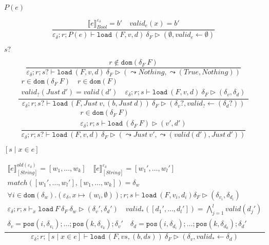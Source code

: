 \documentclass{report}
\theoremstyle{theorem}
\begin{document}
$\boxed{P(e)}$

\begin{displaymath}
	\frac{\llbracket e \rrbracket^{\varepsilon_\delta}_{Bool} = b' \quad valid_e(x) = b'}
	{\varepsilon_\delta ; r ; P(e) \vdash \mathtt{load}~ (F,v,d)~ \delta_F \rhd (\emptyset,valid_e \leftarrow \emptyset)}
\end{displaymath}

$\boxed{s?}$

\begin{displaymath}
	\frac{r \notin \mathtt{dom}(\delta_F~F)}
	{\varepsilon_\delta ; r ; s? \vdash \mathtt{load}~ (F,v,d)~ \delta_F \rhd (\leadsto Nothing,\leadsto (True,Nothing))}
\end{displaymath}
\begin{displaymath}
	\frac{\begin{array}{c}
		r \in \mathtt{dom}(\delta_F~F) \quad r \in \mathtt{dom}(F)\\
		valid_?(Just~d') = valid(d')\quad
		\varepsilon_\delta ; r ; s \vdash \mathtt{load}~ (F,v,d)~ \delta_F \rhd (\delta_v,\delta_d)
	\end{array}}
	{\varepsilon_\delta ; r ; s? \vdash \mathtt{load}~ (F,Just ~v,(b,Just ~d))~ \delta_F \rhd (\delta_v?,valid_? \leftarrow (\delta_d?))}
\end{displaymath}
\begin{displaymath}
	\frac{\begin{array}{c}
		r \in \mathtt{dom}(\delta_F~F) \\
		\varepsilon_\delta ; r ; s \vdash \mathtt{load}~ (\delta_F~F) \rhd (v',d')
	\end{array}}
	{\varepsilon_\delta ; r ; s? \vdash \mathtt{load}~ (F,v,d)~ \delta_F \rhd (\leadsto Just~v',\leadsto (valid(d'),Just~d'))}
\end{displaymath}

$\boxed{[ s \mid x \in e]}$

\begin{displaymath}
	\frac{\begin{array}{c}
		\llbracket e \rrbracket^{old(\varepsilon_\delta)}_{[String]} = [w_1,\dots,w_k] \quad
		\llbracket e \rrbracket^{\varepsilon_\delta}_{[String]} = [w_1',\dots,w_l']\\
		match([w_1',\dots,w_l'],[w_1,\dots,w_k]) = \delta_w\\
		\forall i \in \mathtt{dom}(\delta_w) . (\varepsilon_\delta,x \mapsto (w_i,\emptyset)) ; r ; s \vdash \mathtt{load}~ (F,v_i,d_i) \delta_F \rhd (\delta_{v_i},\delta_{d_i})\\
		\varepsilon_\delta ; r ; s \vdash_x \mathtt{load}~F~ \delta_F ~\delta_w \rhd (\delta_v',\delta_d')\quad
		valid_*([d_1',\dots,d_l']) = \bigwedge_{j=1}^l valid(d_j')\\
		\delta_v = \mathtt{pos}(i,\delta_{v_i}) ; \dots ; \mathtt{pos}(k,\delta_{v_k}) ; \delta_v'\quad
		\delta_d = \mathtt{pos}(i,\delta_{d_i}) ; \dots ; \mathtt{pos}(k,\delta_{d_k}) ; \delta_d'
	\end{array}}
	{\varepsilon_\delta ; r ; [ s \mid x \in e] \vdash \mathtt{load}~ (F,vs,(b,ds))~ \delta_F \rhd (\delta_v,valid_* \leftarrow \delta_d)}
\end{displaymath}
\end{document}
